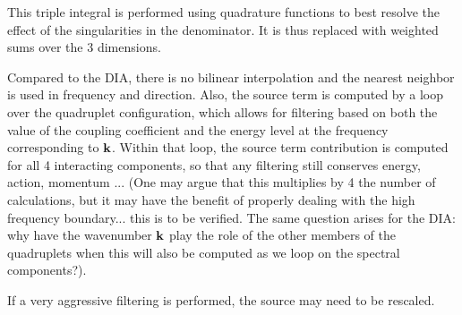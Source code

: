 This triple integral is performed using quadrature functions to best resolve the effect of the singularities in the denominator. It is thus replaced with weighted sums over the 3 dimensions. 

Compared to the DIA, there is no bilinear interpolation and the nearest neighbor is used in frequency and direction. Also, 
the source term is computed by a loop over the quadruplet configuration, which allows for filtering based on 
both the value of the coupling coefficient and the energy level at the frequency corresponding to $\mbox{\bf k}$. Within 
that loop, the source term contribution is computed for all 4 interacting components, so that any filtering still 
conserves energy, action, momentum ... (One may argue that this multiplies by 4 the number of calculations, but it may have the benefit of properly dealing with the high frequency boundary... this is to be verified. The same question arises for the DIA: why have the wavenumber $\mbox{\bf k}$ play the role of the other members of the quadruplets when this will also be computed as we loop on the spectral components?). 

If a very aggressive filtering is performed, the source may need to be rescaled.

